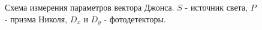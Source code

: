\begin{figure}
\centering



\caption{Схема измерения параметров вектора Джонса. $S$ - источник света, $P$
  - призма Николя, $D_x$ и $D_y$ -
фотодетекторы.}
\label{figPart3EntangJones}
\end{figure}
